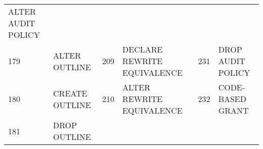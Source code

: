 \begin{longtable}[]{@{}llllll@{}}
\begin{minipage}[t]{0.24\columnwidth}
ALTER AUDIT POLICY\strut
\end{minipage}\tabularnewline
\begin{minipage}[t]{0.06\columnwidth}\raggedright\strut
179\strut
\end{minipage} & \begin{minipage}[t]{0.19\columnwidth}\raggedright\strut
ALTER OUTLINE\strut
\end{minipage} & \begin{minipage}[t]{0.06\columnwidth}\raggedright\strut
209\strut
\end{minipage} & \begin{minipage}[t]{0.24\columnwidth}\raggedright\strut
DECLARE REWRITE EQUIVALENCE\strut
\end{minipage} & \begin{minipage}[t]{0.06\columnwidth}\raggedright\strut
231\strut
\end{minipage} & \begin{minipage}[t]{0.24\columnwidth}\raggedright\strut
DROP AUDIT POLICY\strut
\end{minipage}\tabularnewline
\begin{minipage}[t]{0.06\columnwidth}\raggedright\strut
180\strut
\end{minipage} & \begin{minipage}[t]{0.19\columnwidth}\raggedright\strut
CREATE OUTLINE\strut
\end{minipage} & \begin{minipage}[t]{0.06\columnwidth}\raggedright\strut
210\strut
\end{minipage} & \begin{minipage}[t]{0.24\columnwidth}\raggedright\strut
ALTER REWRITE EQUIVALENCE\strut
\end{minipage} & \begin{minipage}[t]{0.06\columnwidth}\raggedright\strut
232\strut
\end{minipage} & \begin{minipage}[t]{0.24\columnwidth}\raggedright\strut
CODE-BASED GRANT\strut
\end{minipage}\tabularnewline
\begin{minipage}[t]{0.06\columnwidth}\raggedright\strut
181\strut
\end{minipage} & \begin{minipage}[t]{0.19\columnwidth}\raggedright\strut
DROP OUTLINE\strut
\end{minipage} & \begin{minipage}[t]{0.06\columnwidth}\raggedright\strut

\end{minipage}
\end{longtable}

